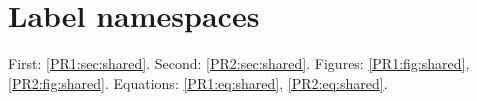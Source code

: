 \documentclass[MEM,PAC]{P3CTeX}
\begin{document}
\chapter{Label namespaces}
First: \ref{PR1:sec:shared}. Second: \ref{PR2:sec:shared}.
Figures: \ref{PR1:fig:shared}, \ref{PR2:fig:shared}.
Equations: \ref{PR1:eq:shared}, \ref{PR2:eq:shared}.
\end{document}
